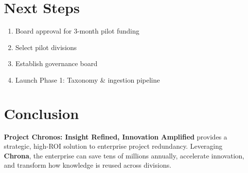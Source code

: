 \documentclass[12pt,a4paper]{article}
\begin{document}
\section{Next Steps}
\begin{enumerate}[leftmargin=2em]
    \item Board approval for 3-month pilot funding  
    \item Select pilot divisions  
    \item Establish governance board  
    \item Launch Phase 1: Taxonomy \& ingestion pipeline 
\end{enumerate}

\section{Conclusion}
\textbf{Project Chronos: Insight Refined, Innovation Amplified} provides a strategic, high-ROI solution to enterprise project redundancy. Leveraging \textbf{Chrona}, the enterprise can save tens of millions annually, accelerate innovation, and transform how knowledge is reused across divisions.
\end{document}
